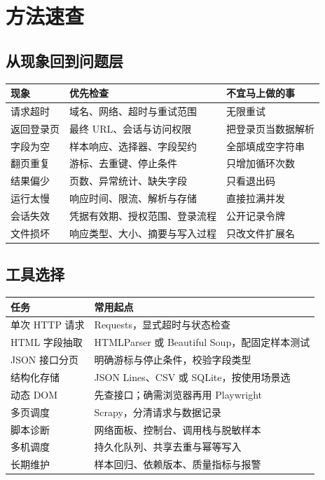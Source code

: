 \chapter{方法速查}\label{app:quickref}
\section{从现象回到问题层}
\begin{center}
\begin{tabularx}{\textwidth}{@{}p{}X X@{}}
\toprule
现象 & 优先检查 & 不宜马上做的事\\
\midrule
请求超时 & 域名、网络、超时与重试范围 & 无限重试\\
返回登录页 & 最终 URL、会话与访问权限 & 把登录页当数据解析\\
字段为空 & 样本响应、选择器、字段契约 & 全部填成空字符串\\
翻页重复 & 游标、去重键、停止条件 & 只增加循环次数\\
结果偏少 & 页数、异常统计、缺失字段 & 只看退出码\\
运行太慢 & 响应时间、限流、解析与存储 & 直接拉满并发\\
会话失效 & 凭据有效期、授权范围、登录流程 & 公开记录令牌\\
文件损坏 & 响应类型、大小、摘要与写入过程 & 只改文件扩展名\\
\bottomrule
\end{tabularx}
\end{center}

\section{工具选择}
\begin{center}
\begin{tabularx}{\textwidth}{@{}p{}X@{}}
\toprule
任务 & 常用起点\\
\midrule
单次 HTTP 请求 & Requests，显式超时与状态检查\\
HTML 字段抽取 & HTMLParser 或 Beautiful Soup，配固定样本测试\\
JSON 接口分页 & 明确游标与停止条件，校验字段类型\\
结构化存储 & JSON Lines、CSV 或 SQLite，按使用场景选\\
动态 DOM & 先查接口；确需浏览器再用 Playwright\\
多页调度 & Scrapy，分清请求与数据记录\\
脚本诊断 & 网络面板、控制台、调用栈与脱敏样本\\
多机调度 & 持久化队列、共享去重与幂等写入\\
长期维护 & 样本回归、依赖版本、质量指标与报警\\
\bottomrule
\end{tabularx}
\end{center}

